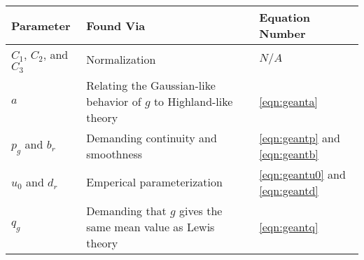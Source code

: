 \begin{center}
	\begin{tabular}{ | l |  p{4.5cm} | l | }
	\hline
	Parameter & Found Via & Equation Number \\ \hline
	$C_1$, $C_2$, and $C_3$ & Normalization & $N/A$ \\ \hline
	$a$ &  Relating the Gaussian-like behavior of $g$ to Highland-like theory \cite{highland} & \ref{eqn:geanta} \\ \hline
	$p_g$ and $b_r$ & Demanding continuity and smoothness & \ref{eqn:geantp} and \ref{eqn:geantb} \\ \hline
	$u_0$ and $d_r$ & Emperical parameterization & \ref{eqn:geantu0} and \ref{eqn:geantd} \\ \hline
	$q_g$ & Demanding that $g$ gives the same mean value as Lewis theory & \ref{eqn:geantq} \\ \hline
	\end{tabular}
\end{center}
